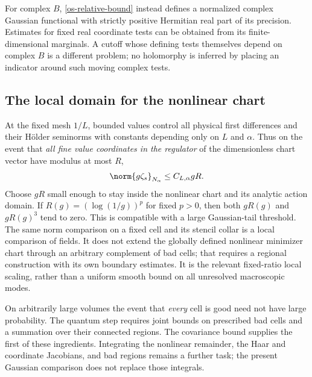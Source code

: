 For complex $B$, \eqref{os-relative-bound} instead defines a
normalized complex Gaussian functional with strictly positive
Hermitian real part of its precision. Estimates for fixed real
coordinate tests can be obtained from its finite-dimensional
marginals. A cutoff whose defining tests themselves depend on
complex $B$ is a different problem; no holomorphy is inferred
by placing an indicator around such moving complex tests.

\subsection{The local domain for the nonlinear chart}
\label{os-chart-domain}

At the fixed mesh $1/L$, bounded values control all physical
first differences and their H\"older seminorms with constants
depending only on $L$ and $\alpha$. Thus on the event that
\emph{all fine value coordinates in the regulator} of the
dimensionless chart vector have modulus at most $R$,
\begin{equation}\label{os-domain-radius}
 \norm{g\zeta_s}_{N_\alpha}\le C_{L,\alpha}gR.
\end{equation}
Choose $gR$ small enough to stay inside the nonlinear chart
and its analytic action domain. If $R(g)=(\log(1/g))^p$
for fixed $p>0$, then both $gR(g)$ and $gR(g)^3$ tend to
zero. This is compatible with a large Gaussian-tail threshold.
The same norm comparison on a fixed cell and its stencil
collar is a local comparison of fields. It does not extend
the globally defined nonlinear minimizer chart through an
arbitrary complement of bad cells; that requires a regional
construction with its own boundary estimates.
It is the relevant fixed-ratio local scaling, rather than
a uniform smooth bound on all unresolved macroscopic modes.

On arbitrarily large volumes the event that \emph{every} cell
is good need not have large probability. The quantum step
requires joint bounds on prescribed bad cells and a summation
over their connected regions. The covariance bound supplies
the first of these ingredients. Integrating the nonlinear
remainder, the Haar and coordinate Jacobians, and bad regions
remains a further task; the present Gaussian comparison does
not replace those integrals.
